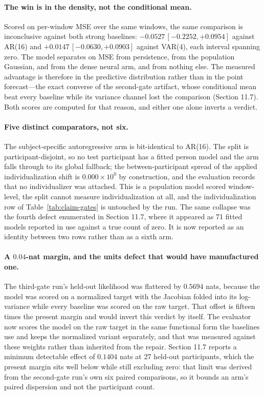 \paragraph{The win is in the density, not the conditional mean.}
Scored on per-window MSE over the same windows, the same comparison is
inconclusive against both strong baselines: \(-0.0527\,[-0.2252, +0.0954]\)
against AR(16) and \(+0.0147\,[-0.0630, +0.0903]\) against VAR(4), each interval
spanning zero. The model separates on MSE from persistence, from the population
Gaussian, and from the dense neural arm, and from nothing else. The measured
advantage is therefore in the predictive distribution rather than in the point
forecast---the exact converse of the second-gate artifact, whose conditional mean
beat every baseline while its variance channel lost the comparison
(Section 11.7). Both scores are computed for that reason, and either one alone
inverts a verdict.

\paragraph{Five distinct comparators, not six.}
The subject-specific autoregressive arm is bit-identical to AR(16). The split is
participant-disjoint, so no test participant has a fitted person model and the
arm falls through to its global fallback; the between-participant spread of the
applied individualization shift is \(0.000\times10^{0}\) by construction, and the
evaluation records that no individualizer was attached. This is a population
model scored window-level, the split cannot measure individualization at all, and
the individualization row of Table~\ref{tab:claim-gates} is untouched by the run.
The same collapse was the fourth defect enumerated in Section 11.7, where it
appeared as 71 fitted models reported in use against a true count of zero. It is
now reported as an identity between two rows rather than as a sixth arm.

\paragraph{A \(0.04\)-nat margin, and the units defect that would have
manufactured one.} The third-gate run's held-out likelihood was flattered by
\(0.5694\) nats, because the model was scored on a normalized target with the
Jacobian folded into its log-variance while every baseline was scored on the raw
target. That offset is fifteen times the present margin and would invert this
verdict by itself. The evaluator now scores the model on the raw target in the
same functional form the baselines use and keeps the normalized variant
separately, and that was measured against these weights rather than inherited
from the repair. Section 11.7 reports a minimum detectable effect of \(0.1404\)
nats at 27 held-out participants, which the present margin sits well below while
still excluding zero: that limit was derived from the second-gate run's own six
paired comparisons, so it bounds an arm's paired dispersion and not the
participant count.

